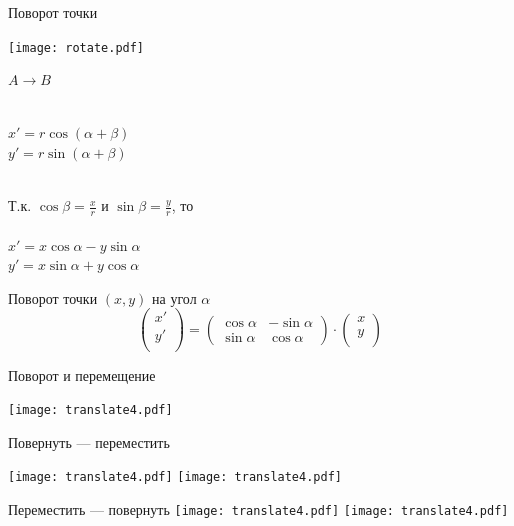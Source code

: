 \documentclass[10pt]{beamer}
\begin{document}
    \begin{frame}{Поворот точки}
    	
    	{
    		\texttt{[image: rotate.pdf]}
    	}
    	{
    		
    		$A \rightarrow B$ \\ ~ \\
    		
    		\pause
    		
    		$x'=r\cos (\alpha+\beta)$ \onslide<3->{ $=r(\cos\alpha \cos\beta-\sin\alpha \sin\beta)$}  \\
    		$y'=r\sin (\alpha+\beta)$  \\~\\
    		
    		\pause[4] 
    		
    		Т.к. $\displaystyle \cos\beta = \frac{x}{r}$ и $\displaystyle\sin\beta=\frac{y}{r}$, то \\ ~ \\
    		
    		$x'=x\cos\alpha-y\sin\alpha$ \\
    		$y'=x\sin\alpha+y\cos\alpha$
    		
    		\pause
    		
    	    \begin{block}{Поворот точки $(x,y)$ на угол $\alpha$}
    	    	$$
    	    	\begin{pmatrix}
    	    		x' \\
    	    		y' \\
    	    	\end{pmatrix}
    	    	=
    	    	\begin{pmatrix}
    	    		\cos\alpha & -\sin\alpha \\
    	    		\sin\alpha & \cos\alpha
    	    	\end{pmatrix}
    	    	\cdot
    	        \begin{pmatrix}
    	    		x \\
    	    		y \\
    	    	\end{pmatrix}
    	    	$$
    	    \end{block}
    		
    		

    	}
    	
    \end{frame}
    
    
    \begin{frame}{Поворот и перемещение}
    	
    	\centering
    	\texttt{[image: translate4.pdf]}
    	{
    		\centering
    		Повернуть --- переместить
    		
    		\texttt{[image: translate4.pdf]}		
    		\texttt{[image: translate4.pdf]}
    	}
    	{
    		\centering
    		Переместить --- повернуть
    		\texttt{[image: translate4.pdf]}		
    		\texttt{[image: translate4.pdf]}
    	}
    	
    \end{frame}
    
\end{document}
